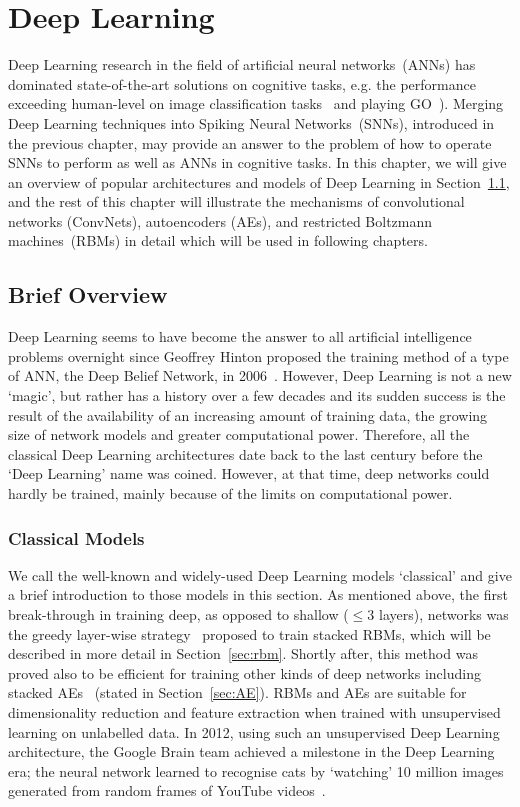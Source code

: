 \chapter{Deep Learning}
\label{cha:dnn}
Deep Learning research in the field of artificial neural networks~(ANNs) has dominated state-of-the-art solutions on cognitive tasks, e.g. the performance exceeding human-level  on image classification tasks~\citep{he2015delving} and playing GO~\citep{silver2016mastering}).
Merging Deep Learning techniques into Spiking Neural Networks~(SNNs), introduced in the previous chapter, may provide an answer to the problem of how to operate SNNs to perform as well as ANNs in cognitive tasks. 
In this chapter, we will give an overview of popular architectures and models of Deep Learning in Section~\ref{sec:dl_history}, and the rest of this chapter will illustrate the mechanisms of convolutional networks (ConvNets), autoencoders (AEs), and restricted Boltzmann machines~(RBMs) in detail which will be used in following chapters.

\section{Brief Overview}
\label{sec:dl_history}
Deep Learning seems to have become the answer to all artificial intelligence problems overnight since Geoffrey Hinton proposed the training method of a type of ANN, the Deep Belief Network, in 2006~\citep{hinton2006fast}.
However, Deep Learning is not a new `magic', but rather has a history over a few decades and its sudden success is the result of the availability of an increasing amount of training data, the growing size of network models and greater computational power.
Therefore, all the classical Deep Learning architectures date back to the last century before the `Deep Learning' name was coined.
However, at that time, deep networks could hardly be trained, mainly because of the limits on computational power.


\subsection{Classical Models}
We call the well-known and widely-used Deep Learning models `classical' and give a brief introduction to those models in this section. 
As mentioned above, the first break-through in training deep, as opposed to shallow ($\le 3$ layers), networks was the greedy layer-wise strategy~\citep{hinton2006fast} proposed to train stacked RBMs, which will be described in more detail in Section~\ref{sec:rbm}.
Shortly after, this method was proved also to be efficient for training other kinds of deep networks including stacked AEs~\citep{bengio2007greedy} (stated in Section~\ref{sec:AE}).
RBMs and AEs are suitable for dimensionality reduction and feature extraction when trained with unsupervised learning on unlabelled data.
In 2012, using such an unsupervised Deep Learning architecture, the Google Brain team achieved a milestone in the Deep Learning era; the neural network learned to recognise cats by `watching' 10 million images generated from random frames of YouTube videos~\citep{le2013building}.

